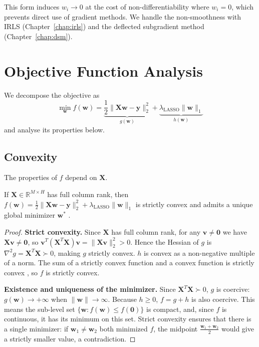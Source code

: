 This form induces $w_i \to 0$ at the cost of non-differentiability where $w_i = 0$, which prevents direct use of gradient methods. We handle the non-smoothness with IRLS (Chapter~\ref{chap:irls}) and the deflected subgradient method (Chapter~\ref{chap:dsm}).



\section{Objective Function Analysis}
We decompose the objective as
\begin{equation}
    \label{eq:obj_fun}
    \min_{\mathbf{w}} f(\mathbf{w}) = \underbrace{\frac{1}{2}\|\mathbf{Xw} - \mathbf{y}\|_2^2}_{g(\mathbf{w})} + \underbrace{\lambda_{\text{LASSO}}\|\mathbf{w}\|_1}_{h(\mathbf{w})}
\end{equation}
and analyse its properties below.

\subsection{Convexity}
The properties of $f$ depend on $\mathbf{X}$.

\begin{proposition}
    \label{prop:irls_prop}
    If $\mathbf{X} \in \mathbb{R}^{M \times H}$ has full column rank, then
    $f(\mathbf{w}) = \frac{1}{2}\|\mathbf{Xw} - \mathbf{y}\|_2^2 + \lambda_{\text{LASSO}}\|\mathbf{w}\|_1$
    is strictly convex and admits a unique global minimizer $\mathbf{w}^*$ \cite[p.~73]{Boyd_Vandenberghe_2004}.
\end{proposition}

\begin{proof}

\textbf{Strict convexity.}
Since $\mathbf{X}$ has full column rank, for any $\mathbf{v} \neq \mathbf{0}$ we have
$\mathbf{Xv} \neq \mathbf{0}$, so $\mathbf{v}^T(\mathbf{X}^T\mathbf{X})\mathbf{v}
= \|\mathbf{Xv}\|_2^2 > 0$. Hence the Hessian of $g$ is
$\nabla^2 g = \mathbf{X}^T\mathbf{X} \succ 0$, making $g$ strictly convex.
$h$ is convex as a non-negative multiple of a norm. The sum of a strictly convex
function and a convex function is strictly convex \cite[Slides 21--24]{frangioni-slides-unconstrained}, so $f$ is strictly convex.
 
\textbf{Existence and uniqueness of the minimizer.}
Since $\mathbf{X}^T\mathbf{X} \succ 0$, $g$ is coercive:
$g(\mathbf{w}) \to +\infty$ when $\|\mathbf{w}\| \to \infty$. Because $h \geq 0$,
$f = g + h$ is also coercive. This means the sub-level set
$\{\mathbf{w} : f(\mathbf{w}) \leq f(\mathbf{0})\}$ is compact, and, since
$f$ is continuous, it has its minimum on this set. Strict convexity ensures that there is a single minimizer: if $\mathbf{w}_1 \neq \mathbf{w}_2$ both
minimized $f$, the midpoint $\frac{\mathbf{w}_1 + \mathbf{w}_2}{2}$ would give
a strictly smaller value, a contradiction.
\end{proof}

